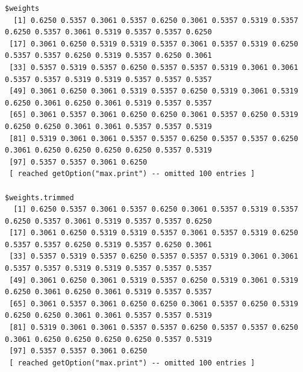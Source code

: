\documentclass[a4paper]{article}
\begin{document}
\begin{verbatim}
$weights
  [1] 0.6250 0.5357 0.3061 0.5357 0.6250 0.3061 0.5357 0.5319 0.5357 0.6250 0.5357 0.3061 0.5319 0.5357 0.5357 0.6250
 [17] 0.3061 0.6250 0.5319 0.5319 0.5357 0.3061 0.5357 0.5319 0.6250 0.5357 0.5357 0.6250 0.5319 0.5357 0.6250 0.3061
 [33] 0.5357 0.5319 0.5357 0.6250 0.5357 0.5357 0.5319 0.3061 0.3061 0.5357 0.5357 0.5319 0.5319 0.5357 0.5357 0.5357
 [49] 0.3061 0.6250 0.3061 0.5319 0.5357 0.6250 0.5319 0.3061 0.5319 0.6250 0.3061 0.6250 0.3061 0.5319 0.5357 0.5357
 [65] 0.3061 0.5357 0.3061 0.6250 0.6250 0.3061 0.5357 0.6250 0.5319 0.6250 0.6250 0.3061 0.3061 0.5357 0.5357 0.5319
 [81] 0.5319 0.3061 0.3061 0.5357 0.5357 0.6250 0.5357 0.5357 0.6250 0.3061 0.6250 0.6250 0.6250 0.6250 0.5357 0.5319
 [97] 0.5357 0.5357 0.3061 0.6250
 [ reached getOption("max.print") -- omitted 100 entries ]

$weights.trimmed
  [1] 0.6250 0.5357 0.3061 0.5357 0.6250 0.3061 0.5357 0.5319 0.5357 0.6250 0.5357 0.3061 0.5319 0.5357 0.5357 0.6250
 [17] 0.3061 0.6250 0.5319 0.5319 0.5357 0.3061 0.5357 0.5319 0.6250 0.5357 0.5357 0.6250 0.5319 0.5357 0.6250 0.3061
 [33] 0.5357 0.5319 0.5357 0.6250 0.5357 0.5357 0.5319 0.3061 0.3061 0.5357 0.5357 0.5319 0.5319 0.5357 0.5357 0.5357
 [49] 0.3061 0.6250 0.3061 0.5319 0.5357 0.6250 0.5319 0.3061 0.5319 0.6250 0.3061 0.6250 0.3061 0.5319 0.5357 0.5357
 [65] 0.3061 0.5357 0.3061 0.6250 0.6250 0.3061 0.5357 0.6250 0.5319 0.6250 0.6250 0.3061 0.3061 0.5357 0.5357 0.5319
 [81] 0.5319 0.3061 0.3061 0.5357 0.5357 0.6250 0.5357 0.5357 0.6250 0.3061 0.6250 0.6250 0.6250 0.6250 0.5357 0.5319
 [97] 0.5357 0.5357 0.3061 0.6250
 [ reached getOption("max.print") -- omitted 100 entries ]
\end{verbatim}






\end{document}
